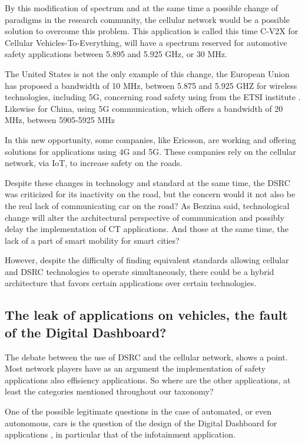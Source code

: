By this modification of spectrum and at the same time a possible change of paradigms in the research community, the cellular network would be a possible solution to overcome this problem. This application is called this time C-V2X for Cellular Vehicles-To-Everything, will have a spectrum reserved for automotive safety applications between 5.895 and 5.925 GHz, or 30 MHz.\cite{fcc_fcc_2020}

The United States is not the only example of this change, the European Union has proposed a bandwidth of 10 MHz, between 5.875 and 5.925 GHZ for wireless technologies, including 5G, concerning road safety using from the ETSI institute \cite{anonymous_harmonisation_2020}. Likewise for China, using 5G communication, which offers a bandwidth of 20 MHz, between 5905-5925 MHz\cite{qualcomm_c-v2x_2021}

In this new opportunity, some companies, like Ericsson\cite{ericsson_c-v2x_2021}, are working and offering solutions for applications using 4G and 5G. These companies rely on the cellular network, via IoT, to increase safety on the roads.

Despite these changes in technology and standard at the same time, the DSRC was criticized for its inactivity on the road, but the concern would it not also be the real lack of communicating car on the road? As Bezzina said, technological change will alter the architectural perspective of communication\cite{gmt_pilot_nodate} and possibly delay the implementation of CT applications. And those at the same time, the lack of a part of smart mobility for smart cities?

However, despite the difficulty of finding equivalent standards allowing cellular and DSRC technologies to operate simultaneously, there could be a hybrid architecture that favors certain applications over certain technologies.\cite{kiela_review_2020}

\subsection{The leak of applications on vehicles, the fault of the Digital Dashboard? }

The debate between the use of DSRC and the cellular network, shows a point. Most network players have as an argument the implementation of safety applications also effisiency applications. So where are the other applications, at least the categories mentioned throughout our taxonomy?

One of the possible legitimate questions in the case of automated, or even autonomous, cars is the question of the design of the Digital Dashboard for applications \cite{gowda_dashboard_2014}, in particular that of the infotainment application\cite{heikkinen_mobile_2013}.

